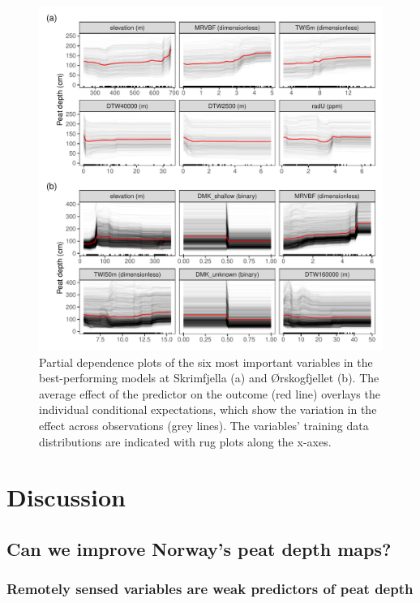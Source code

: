 \documentclass[soil, manuscript]{copernicus}
\begin{document}
\begin{figure}
\includegraphics[width=1\linewidth]{figures/partial_dependence} \caption{Partial dependence plots of the six most important variables in the best-performing models at Skrimfjella (a) and Ørskogfjellet (b). The average effect of the predictor on the outcome (red line) overlays the individual conditional expectations, which show the variation in the effect across observations (grey lines). The variables' training data distributions are indicated with rug plots along the x-axes.}\label{fig:pdps}
\end{figure}

\section{Discussion}

\subsection{Can we improve Norway's peat depth maps?}

\subsubsection{Remotely sensed variables are weak predictors of peat depth}
\end{document}
